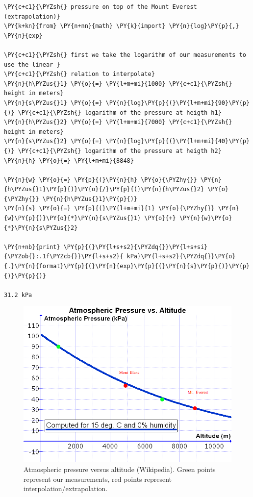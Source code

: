 \begin{tcolorbox}[breakable, size=fbox, boxrule=1pt, pad at break*=1mm,colback=cellbackground, colframe=cellborder]
\begin{Verbatim}[commandchars=\\\{\}]
\PY{c+c1}{\PYZsh{} pressure on top of the Mount Everest (extrapolation)}
\PY{k+kn}{from} \PY{n+nn}{math} \PY{k}{import} \PY{n}{log}\PY{p}{,} \PY{n}{exp}

\PY{c+c1}{\PYZsh{} first we take the logarithm of our measurements to use the linear }
\PY{c+c1}{\PYZsh{} relation to interpolate}
\PY{n}{h\PYZus{}1} \PY{o}{=} \PY{l+m+mi}{1000} \PY{c+c1}{\PYZsh{} height in meters}
\PY{n}{s\PYZus{}1} \PY{o}{=} \PY{n}{log}\PY{p}{(}\PY{l+m+mi}{90}\PY{p}{)} \PY{c+c1}{\PYZsh{} logarithm of the pressure at heigth h1}
\PY{n}{h\PYZus{}2} \PY{o}{=} \PY{l+m+mi}{7000} \PY{c+c1}{\PYZsh{} height in meters}
\PY{n}{s\PYZus{}2} \PY{o}{=} \PY{n}{log}\PY{p}{(}\PY{l+m+mi}{40}\PY{p}{)} \PY{c+c1}{\PYZsh{} logarithm of the pressure at heigth h2}
\PY{n}{h} \PY{o}{=} \PY{l+m+mi}{8848}

\PY{n}{w} \PY{o}{=} \PY{p}{(}\PY{n}{h} \PY{o}{\PYZhy{}} \PY{n}{h\PYZus{}1}\PY{p}{)}\PY{o}{/}\PY{p}{(}\PY{n}{h\PYZus{}2} \PY{o}{\PYZhy{}} \PY{n}{h\PYZus{}1}\PY{p}{)}
\PY{n}{s} \PY{o}{=} \PY{p}{(}\PY{l+m+mi}{1} \PY{o}{\PYZhy{}} \PY{n}{w}\PY{p}{)}\PY{o}{*}\PY{n}{s\PYZus{}1} \PY{o}{+} \PY{n}{w}\PY{o}{*}\PY{n}{s\PYZus{}2}

\PY{n+nb}{print} \PY{p}{(}\PY{l+s+s2}{\PYZdq{}}\PY{l+s+si}{\PYZob{}:.1f\PYZcb{}}\PY{l+s+s2}{ kPa}\PY{l+s+s2}{\PYZdq{}}\PY{o}{.}\PY{n}{format}\PY{p}{(}\PY{n}{exp}\PY{p}{(}\PY{n}{s}\PY{p}{)}\PY{p}{)}\PY{p}{)}

31.2 kPa
\end{Verbatim}
\end{tcolorbox}

\begin{figure}
\centering
\includegraphics[width=0.7\linewidth]{Atmospheric_Pressure_vs._Altitude.png}
\caption{Atmospheric pressure versus altitude (Wikipedia). Green points
represent our measurements, red points represent
interpolation/extrapolation.}
\end{figure}

